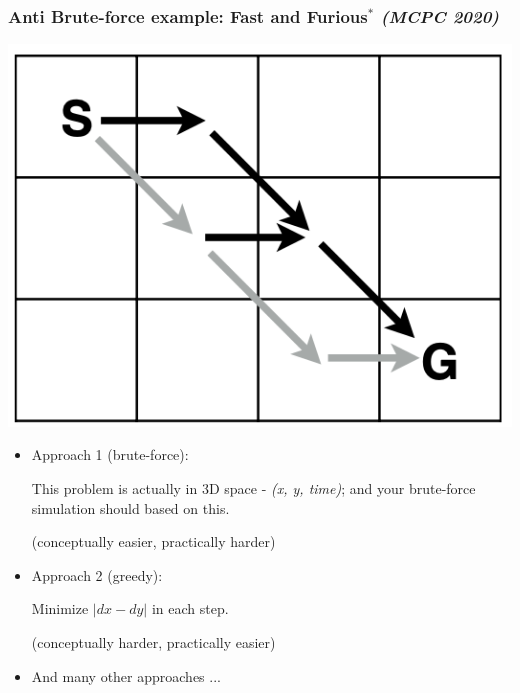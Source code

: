 \documentclass{beamer}
\begin{document}
\begin{frame}
  \frametitle{Anti Brute-force example: Fast and Furious$^*$ \textit{\small(MCPC 2020)}}
\begin{minipage}{.3\textwidth}
  \hspace{-8mm}
  \includegraphics[width=1.1\textwidth]{pics/grid.png} 
\end{minipage}%
\begin{minipage}{.7\textwidth}
  \begin{itemize}
    \item<1-> {
      Approach 1 (brute-force):


      This problem is actually in 3D space - \textit{(x, y, time)};
      and your brute-force simulation should based on this.


      (conceptually easier, practically harder)
    }

    \item<2-> {
      Approach 2 (greedy):

      Minimize $|dx - dy|$ in each step.


      (conceptually harder, practically easier)
    }
    
    \item<3-> {
      And many other approaches ...
    }

  \end{itemize}
\end{minipage}
\end{frame}
\end{document}
